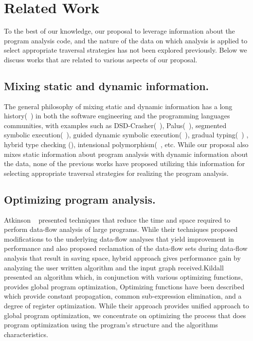 \chapter{Related Work}
\label{sec:related}

To the best of our knowledge, our proposal to leverage information about the
program analysis code, and the nature of the data on which analysis is applied
to select appropriate traversal strategies has not been explored previously.
Below we discuss works that are related to various aspects of our proposal. 

\section{Mixing static and dynamic information.} %
The general philosophy of mixing static and dynamic information has a long 
history(~\cite{Ernst2003}) in both the software engineering and the programming 
languages communities, with examples such as DSD-Crasher(~\cite{DSD-Crasher}), 
Palus(~\cite{Palus}), segmented symbolic execution(~\cite{Le2013}), guided 
dynamic symbolic execution(~\cite{Christakis2016}), gradual typing(~\cite{Siek07})
, hybrid type checking (\cite{Flanagan06}), intensional polymorphism(~\cite{Harper95), 
Crary98}, etc. While our proposal also mixes static information 
about program analysis with dynamic information about the data, none of the 
previous works have proposed utilizing this information for selecting 
appropriate traversal strategies for realizing the program analysis.

\section{Optimizing program analysis.}%
Atkinson ~\cite{atkinson2001implementation} presented techniques that reduce 
the time and space required to perform data-flow analysis of large programs. 
While their techniques proposed modifications to the underlying data-flow 
analyses that yield improvement in performance and also proposed reclamation 
of the data-flow sets during data-flow analysis that result in saving space, 
hybrid approach gives performance gain by analyzing the user written 
algorithm and the input graph received.\newline Kildall ~\cite{kildall1973unified} 
presented an algorithm which, in conjunction with various optimizing 
functions, provides global program optimization, Optimizing functions have 
been described which provide constant propagation, common sub-expression 
elimination, and a degree of register optimization. While their approach 
provides unified approach to global program optimization, we concentrate on 
optimizing the process that does program optimization using the program's 
structure and the algorithms characteristics.

